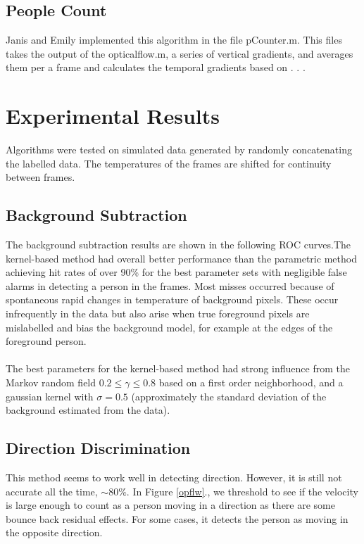 \documentclass[12pt,oneside]{article} %
\begin{document}
\subsection{People Count}
Janis and Emily implemented this algorithm in the file pCounter.m. This files takes the output of the opticalflow.m, a series of vertical gradients, and averages them per a frame and calculates the temporal gradients based on . . .

\section{Experimental Results}  %
Algorithms were tested on simulated data generated by randomly concatenating the labelled data.
The temperatures of the frames are shifted for continuity between frames. 

\subsection{Background Subtraction}  %
The background subtraction results are shown in the following ROC curves.The kernel-based method
had overall better performance than the parametric method achieving hit rates of over 90\% for the best
parameter sets with negligible false alarms in detecting a person in the frames. Most misses occurred
because of spontaneous rapid changes in temperature of background pixels. These occur infrequently
in the data but also arise when true foreground pixels are mislabelled and bias the background model, for 
example at the edges of the foreground person.
\\ \\
The best parameters for the kernel-based method had strong influence from the Markov random field
$0.2 \le \gamma \le 0.8$ based on a first order neighborhood, 
and a gaussian kernel with $\sigma = 0.5$ (approximately the standard deviation of 
the background estimated from the data).

\subsection{Direction Discrimination}  %
This method seems to work well in detecting direction. However, it is still not accurate all the time, $\sim80\%$.
In Figure \ref{opflw}., we threshold to see if the velocity is large enough to count as a person moving in a direction
as there are some bounce back residual effects. For some 
cases, it detects the person as moving in the opposite direction. 
\end{document}
